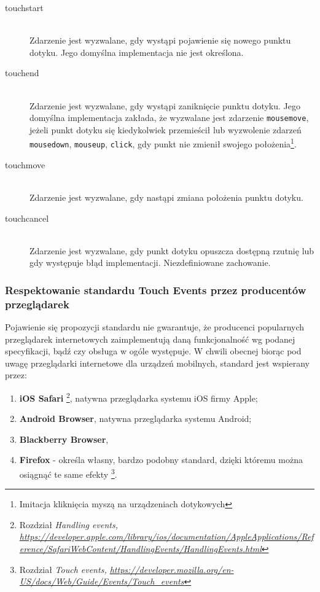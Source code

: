 \begin{description}
  \item[touchstart] \hfill \\
  Zdarzenie jest wyzwalane, gdy wystąpi pojawienie się nowego punktu dotyku. Jego domyślna implementacja nie jest określona.
  \item[touchend] \hfill \\
  Zdarzenie jest wyzwalane, gdy wystąpi zaniknięcie punktu dotyku. Jego domyślna implementacja zakłada, że wyzwalane jest zdarzenie \lstinline{mousemove}, jeżeli punkt dotyku się kiedykolwiek przemieścił lub wyzwolenie zdarzeń \lstinline{mousedown}, \lstinline{mouseup}, \lstinline{click}, gdy punkt nie zmienił swojego położenia\footnote{Imitacja kliknięcia myszą na urządzeniach dotykowych}.
  \item[touchmove] \hfill \\
  Zdarzenie jest wyzwalane, gdy nastąpi zmiana położenia punktu dotyku.
  \item[touchcancel] \hfill \\
  Zdarzenie jest wyzwalane, gdy punkt dotyku opuszcza dostępną rzutnię lub gdy występuje błąd implementacji. Niezdefiniowane zachowanie.
\end{description}

\subsubsection{Respektowanie standardu Touch Events przez producentów przeglądarek}
\label{subsec:w3c-touch-events-implementations}

Pojawienie się propozycji standardu nie gwarantuje, że producenci popularnych przeglądarek internetowych zaimplementują daną funkcjonalność wg podanej specyfikacji, bądź czy obsługa w ogóle występuje. W chwili obecnej biorąc pod uwagę przeglądarki internetowe dla urządzeń mobilnych, standard jest wspierany przez\cite{caniuse-touch-events}:

\begin{enumerate}
  \item \textbf{iOS Safari}\cite{browser-ios-safari} \footnote{\cite{browser-ios-safari} Rozdział \em{Handling events}, \url{https://developer.apple.com/library/ios/documentation/AppleApplications/Reference/SafariWebContent/HandlingEvents/HandlingEvents.html}}, natywna przeglądarka systemu iOS firmy Apple;
  \item \textbf{Android Browser}, natywna przeglądarka systemu Android;
  \item \textbf{Blackberry Browser},
  \item \textbf{Firefox} - określa własny, bardzo podobny standard, dzięki któremu można osiągnąć te same efekty\cite{browser-firefox} \footnote{\cite{browser-firefox} Rozdział \em{Touch events}, \url{https://developer.mozilla.org/en-US/docs/Web/Guide/Events/Touch_events}}.
\end{enumerate}

